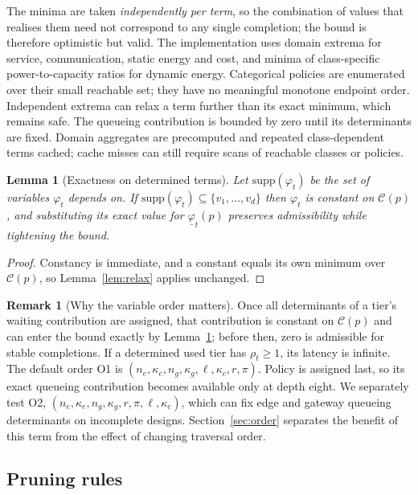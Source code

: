 \documentclass[preprint,11pt,3p]{elsarticle}
\theoremstyle{plain}
\newtheorem{lemma}{Lemma}
\theoremstyle{definition}
\newtheorem{remark}{Remark}
\newcommand{\C}{\mathcal{C}}
\begin{document}
The minima are taken \emph{independently per term}, so the combination of values that
realises them need not correspond to any single completion; the bound is therefore
optimistic but valid. The implementation uses domain extrema for service, communication,
static energy and cost, and minima of class-specific power-to-capacity ratios
for dynamic energy. Categorical policies are enumerated over their small
reachable set; they have no meaningful monotone endpoint order. Independent
extrema can relax a term further than its exact minimum, which remains safe.
The queueing contribution is bounded by zero until its determinants are fixed.
Domain aggregates are precomputed and repeated class-dependent terms cached;
cache misses can still require scans of reachable classes or policies.

\begin{lemma}[Exactness on determined terms]
\label{lem:exact}
Let $\mathrm{supp}(\varphi_t)$ be the set of variables $\varphi_t$ depends on. If
$\mathrm{supp}(\varphi_t)\subseteq\{v_1,\dots,v_d\}$ then $\varphi_t$ is constant on
$\C(p)$, and substituting its exact value for $\underline{\varphi}_t(p)$ preserves
admissibility while tightening the bound.
\end{lemma}
\begin{proof}
Constancy is immediate, and a constant equals its own minimum over $\C(p)$, so
Lemma~\ref{lem:relax} applies unchanged.
\end{proof}

\begin{remark}[Why the variable order matters]
\label{rem:order}
Once all determinants of a tier's waiting contribution are assigned,
that contribution is constant on $\C(p)$ and can enter the bound exactly by
Lemma~\ref{lem:exact}; before then, zero is admissible for stable completions.
If a determined used tier has $\rho_t\ge1$, its latency is infinite.
The default order O1 is $(n_e,\kappa_e,n_g,\kappa_g,\ell,\kappa_c,r,\pi)$.
Policy is assigned last, so its exact queueing contribution becomes available only at
depth eight. We separately test O2,
$(n_e,\kappa_e,n_g,\kappa_g,r,\pi,\ell,\kappa_c)$, which can fix edge and gateway
queueing determinants on incomplete designs. Section~\ref{sec:order} separates the
benefit of this term from the effect of changing traversal order.
\end{remark}

\subsection{Pruning rules}
\end{document}
